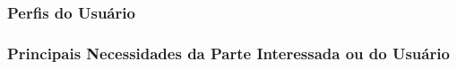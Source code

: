 \subsubsection{Perfis do Usuário}

\subsubsection{Principais Necessidades da Parte Interessada ou do Usuário}
 	 	 	 	 
